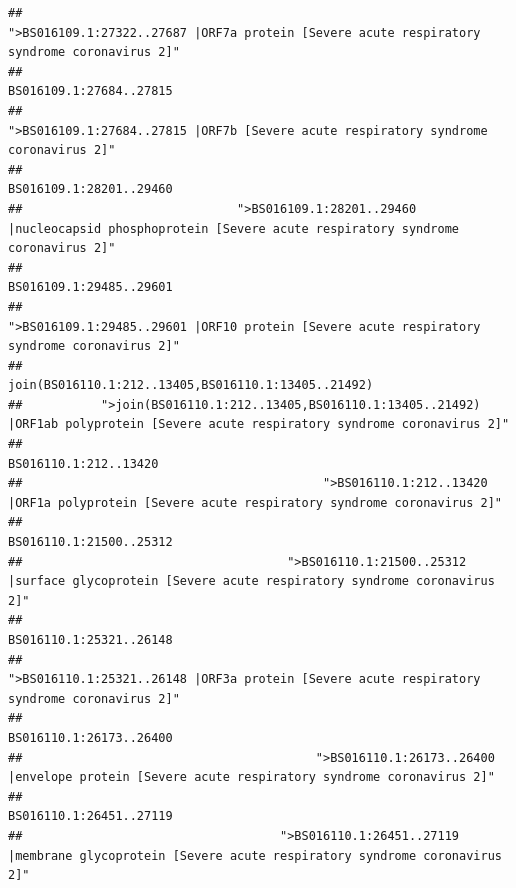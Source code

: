\documentclass[
]{article}
\begin{document}
\begin{verbatim}
##                                            ">BS016109.1:27322..27687 |ORF7a protein [Severe acute respiratory syndrome coronavirus 2]" 
##                                                                                                                BS016109.1:27684..27815 
##                                                    ">BS016109.1:27684..27815 |ORF7b [Severe acute respiratory syndrome coronavirus 2]" 
##                                                                                                                BS016109.1:28201..29460 
##                              ">BS016109.1:28201..29460 |nucleocapsid phosphoprotein [Severe acute respiratory syndrome coronavirus 2]" 
##                                                                                                                BS016109.1:29485..29601 
##                                            ">BS016109.1:29485..29601 |ORF10 protein [Severe acute respiratory syndrome coronavirus 2]" 
##                                                                                    join(BS016110.1:212..13405,BS016110.1:13405..21492) 
##           ">join(BS016110.1:212..13405,BS016110.1:13405..21492) |ORF1ab polyprotein [Severe acute respiratory syndrome coronavirus 2]" 
##                                                                                                                  BS016110.1:212..13420 
##                                          ">BS016110.1:212..13420 |ORF1a polyprotein [Severe acute respiratory syndrome coronavirus 2]" 
##                                                                                                                BS016110.1:21500..25312 
##                                     ">BS016110.1:21500..25312 |surface glycoprotein [Severe acute respiratory syndrome coronavirus 2]" 
##                                                                                                                BS016110.1:25321..26148 
##                                            ">BS016110.1:25321..26148 |ORF3a protein [Severe acute respiratory syndrome coronavirus 2]" 
##                                                                                                                BS016110.1:26173..26400 
##                                         ">BS016110.1:26173..26400 |envelope protein [Severe acute respiratory syndrome coronavirus 2]" 
##                                                                                                                BS016110.1:26451..27119 
##                                    ">BS016110.1:26451..27119 |membrane glycoprotein [Severe acute respiratory syndrome coronavirus 2]" 

\end{verbatim}
\end{document}
